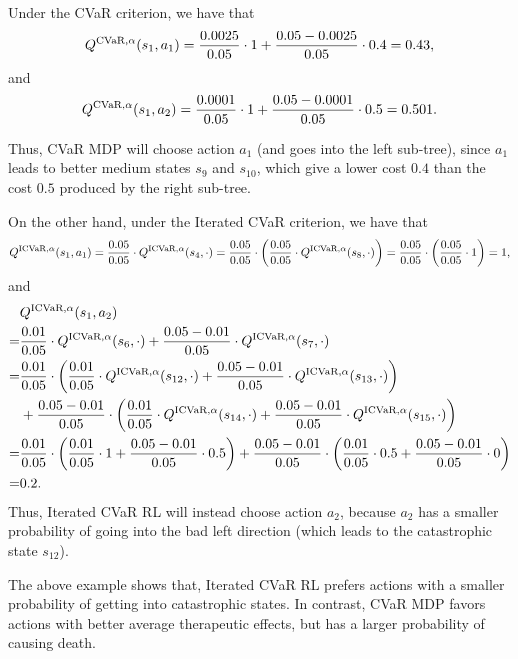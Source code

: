 {	
	
	Under the CVaR criterion, we have that 
	$$
	Q^{\textup{CVaR}, \alpha}(s_1,a_1)=\frac{0.0025}{0.05} \cdot 1+\frac{0.05-0.0025}{0.05} \cdot 0.4=0.43 ,
	$$
	and 
	$$
	Q^{\textup{CVaR}, \alpha}(s_1,a_2)=\frac{0.0001}{0.05} \cdot 1+\frac{0.05-0.0001}{0.05} \cdot 0.5=0.501 .
	$$
	
	Thus, CVaR MDP will choose action $a_1$ (and goes into the left sub-tree), since $a_1$ leads to better medium states $s_9$ and $s_{10}$, which give a lower cost $0.4$ than the cost $0.5$ produced by the right sub-tree.
	
	On the other hand, under the Iterated CVaR criterion, we have that
	$$
	Q^{\textup{ICVaR}, \alpha}(s_1,a_1)=\frac{0.05}{0.05} \cdot Q^{\textup{ICVaR}, \alpha}(s_4,\cdot)=\frac{0.05}{0.05} \cdot \left( \frac{0.05}{0.05} \cdot Q^{\textup{ICVaR}, \alpha}(s_8,\cdot) \right)=\frac{0.05}{0.05} \cdot \left( \frac{0.05}{0.05} \cdot 1 \right)=1 ,
	$$ 
	and 
	\begin{align*}
		&Q^{\textup{ICVaR}, \alpha}(s_1,a_2)
		\\
		=&\frac{0.01}{0.05} \cdot Q^{\textup{ICVaR}, \alpha}(s_6,\cdot) + \frac{0.05-0.01}{0.05} \cdot Q^{\textup{ICVaR}, \alpha}(s_7,\cdot) 
		\\
		=&\frac{0.01}{0.05} \cdot \left( \frac{0.01}{0.05} \cdot Q^{\textup{ICVaR}, \alpha}(s_{12},\cdot) + \frac{0.05-0.01}{0.05} \cdot Q^{\textup{ICVaR}, \alpha}(s_{13},\cdot) \right) \\& + \frac{0.05-0.01}{0.05} \cdot \left( \frac{0.01}{0.05} \cdot Q^{\textup{ICVaR}, \alpha}(s_{14},\cdot) + \frac{0.05-0.01}{0.05} \cdot Q^{\textup{ICVaR}, \alpha}(s_{15},\cdot) \right) 
		\\
		=&\frac{0.01}{0.05} \cdot \left( \frac{0.01}{0.05} \cdot 1 + \frac{0.05-0.01}{0.05} \cdot 0.5 \right) + \frac{0.05-0.01}{0.05} \cdot \left( \frac{0.01}{0.05} \cdot 0.5 + \frac{0.05-0.01}{0.05} \cdot 0 \right) 
		\\
		=&0.2 .
	\end{align*}
	Thus, Iterated CVaR RL will instead choose action $a_2$, because $a_2$ has a smaller probability of going into the bad left direction (which leads to the catastrophic state $s_{12}$).
	
	
	The above example shows that, Iterated CVaR RL prefers actions with a smaller probability of getting into catastrophic states. In contrast, CVaR MDP favors actions with better average therapeutic effects, but has a larger probability of causing death. 
	
}
